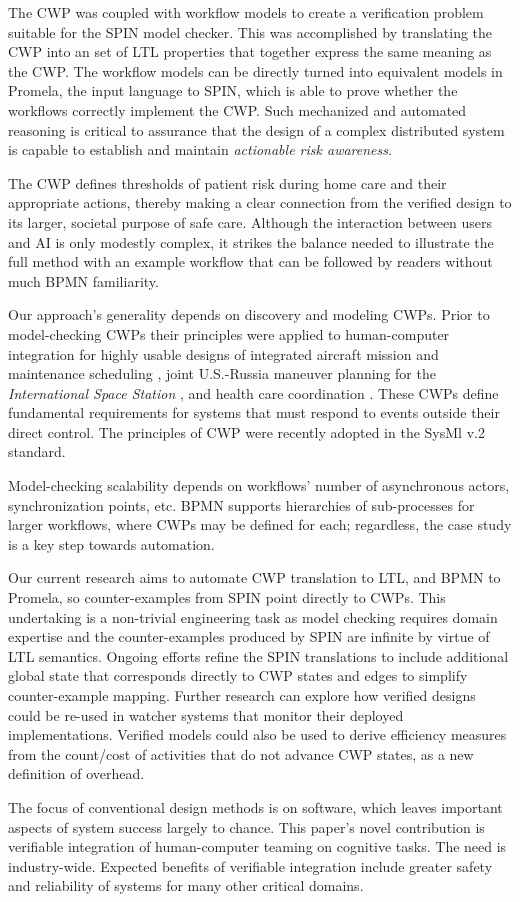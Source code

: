 The CWP was coupled with workflow models to create a verification problem suitable for the SPIN model checker. This was accomplished by translating the CWP into an set of LTL properties that together express the same meaning as the CWP. The workflow models can be directly turned into equivalent models in Promela, the input language to SPIN, which is able to prove whether the workflows correctly implement the CWP. Such mechanized and automated reasoning is critical to assurance that the design of a complex distributed system is capable to establish and maintain \emph{actionable risk awareness}. 

The CWP defines thresholds of patient risk during home care and their appropriate actions, thereby making a clear connection from the verified design to its larger, societal purpose of safe care. Although the interaction between users and AI is only modestly complex, it strikes the balance needed to illustrate the full method with an example workflow that can be followed by readers without much BPMN familiarity.

Our approach's generality depends on discovery and modeling CWPs. Prior to model-checking CWPs their principles  were applied to human-computer integration for highly usable designs of integrated aircraft mission and maintenance scheduling \cite{workcentered}, joint U.S.-Russia maneuver planning for the \emph{International Space Station}  \cite{10.1145/1978942.1979311}, and health care coordination \cite{BERRY201615}. These CWPs define fundamental requirements for systems that must respond to events outside their direct control. The principles of CWP were recently adopted in the SysMl v.2 standard.

Model-checking scalability depends on workflows' number of asynchronous actors, synchronization points, etc. BPMN supports hierarchies of sub-processes for larger workflows, where CWPs may be defined for each; regardless, the case study is a key step towards automation. 

Our current research aims to automate CWP translation to LTL, and BPMN to Promela, so counter-examples from SPIN point directly to CWPs. This undertaking is a non-trivial engineering task as model checking requires domain expertise and the counter-examples produced by SPIN are infinite by virtue of LTL semantics. Ongoing efforts refine the SPIN translations to include additional global state that corresponds directly to CWP states and edges to simplify counter-example mapping. Further research can explore how verified designs could be re-used in watcher systems that monitor their deployed implementations. Verified models could also be used to derive efficiency measures from the count/cost of activities that do not advance CWP states, as a new definition of overhead.  

The focus of conventional design methods is on software, which leaves important aspects of system success largely to chance. This paper's novel contribution is verifiable integration of human-computer teaming on cognitive tasks. The need is industry-wide. Expected benefits of verifiable integration include greater safety and reliability of systems for many other critical domains. 
